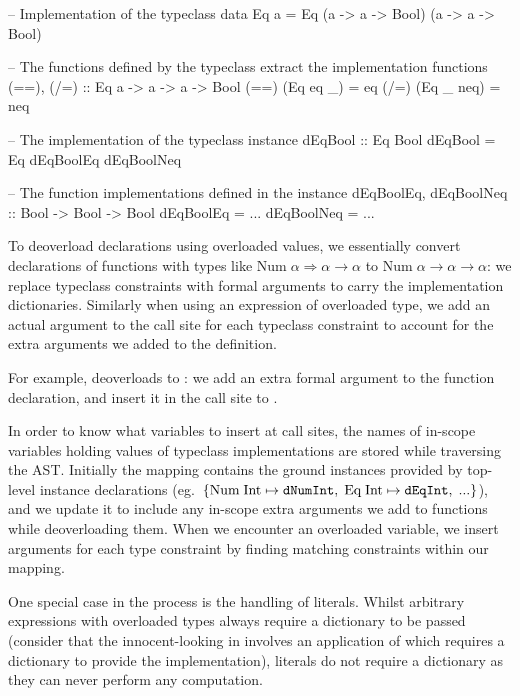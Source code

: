 \documentclass[dissertation.tex]{subfiles}
\begin{document}
{{{            \begin{haskellfigure}
            -- Implementation of the typeclass
            data Eq a = Eq (a -> a -> Bool) (a -> a -> Bool)

            -- The functions defined by the typeclass extract the implementation functions
            (==), (/=) :: Eq a -> a -> a -> Bool
            (==) (Eq eq _) = eq
            (/=) (Eq _ neq) = neq

            -- The implementation of the typeclass instance
            dEqBool :: Eq Bool
            dEqBool = Eq dEqBoolEq dEqBoolNeq

            -- The function implementations defined in the instance
            dEqBoolEq, dEqBoolNeq :: Bool -> Bool -> Bool
            dEqBoolEq = ...
            dEqBoolNeq = ...
            \end{haskellfigure}


            To deoverload declarations using overloaded values, we essentially convert declarations of functions with
            types like \(\text{Num}\;\alpha\Rightarrow\alpha\rightarrow\alpha\) to
            \(\text{Num}\;\alpha\rightarrow\alpha\rightarrow\alpha\): we replace typeclass constraints with formal
            arguments to carry the implementation dictionaries. Similarly when using an expression of overloaded type,
            we add an actual argument to the call site for each typeclass constraint to account for the extra arguments
            we added to the definition.
            
            For example,  deoverloads to : we add an extra
            formal argument to the function declaration, and insert it in the call site to \haskell{+}.

            In order to know what variables to insert at call sites, the names of in-scope variables holding values of
            typeclass implementations are stored while traversing the AST. Initially the mapping contains the ground
            instances provided by top-level instance declarations (eg.\
            \(\{\text{Num\;Int}\mapsto\texttt{dNumInt},\;\text{Eq\;Int}\mapsto\texttt{dEqInt},\;...\}\)), and we update
            it to include any in-scope extra arguments we add to functions while deoverloading them. When we encounter
            an overloaded variable, we insert arguments for each type constraint by finding matching constraints within
            our mapping.

            One special case in the process is the handling of literals. Whilst arbitrary expressions with overloaded
            types always require a dictionary to be passed (consider that the innocent-looking \haskell{x} in
            \haskell{let x = 1 + 2 in x} involves an application of \haskell{+} which requires a dictionary to provide
            the implementation), literals do not require a dictionary as they can never perform any computation.

}}}
\end{document}
